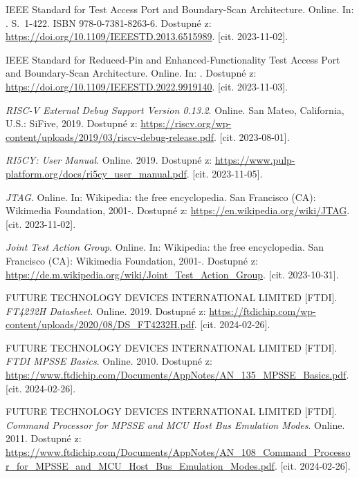 

\begin{thebibliography}{99}

IEEE Standard for Test Access Port and Boundary-Scan Architecture. Online. In: . S.~1-422. ISBN 978-0-7381-8263-6. Dostupné z: \url{https://doi.org/10.1109/IEEESTD.2013.6515989}. [cit. 2023-11-02].

IEEE Standard for Reduced-Pin and Enhanced-Functionality Test Access Port and Boundary-Scan Architecture. Online. In: . Dostupné z: \url{https://doi.org/10.1109/IEEESTD.2022.9919140}. [cit. 2023-11-03].

\textit{RISC-V External Debug Support Version 0.13.2}. Online. San Mateo, California, U.S.: SiFive, 2019. Dostupné z: \url{https://riscv.org/wp-content/uploads/2019/03/riscv-debug-release.pdf}. [cit. 2023-08-01].

\textit{RI5CY: User Manual}. Online. 2019. Dostupné z: \url{https://www.pulp-platform.org/docs/ri5cy\_user\_manual.pdf}. [cit. 2023-11-05].

\textit{JTAG}. Online. In: Wikipedia: the free encyclopedia. San Francisco (CA): Wikimedia Foundation, 2001-. Dostupné z: \url{https://en.wikipedia.org/wiki/JTAG}. [cit. 2023-11-02].

\textit{Joint Test Action Group}. Online. In: Wikipedia: the free encyclopedia. San Francisco (CA): Wikimedia Foundation, 2001-. Dostupné z: \url{https://de.m.wikipedia.org/wiki/Joint\_Test\_Action\_Group}. [cit. 2023-10-31].

FUTURE TECHNOLOGY DEVICES INTERNATIONAL LIMITED [FTDI]. \textit{FT4232H Datasheet}. Online. 2019. Dostupné z: \url{https://ftdichip.com/wp-content/uploads/2020/08/DS\_FT4232H.pdf}. [cit. 2024-02-26].

FUTURE TECHNOLOGY DEVICES INTERNATIONAL LIMITED [FTDI]. \textit{FTDI MPSSE Basics}. Online. 2010. Dostupné z: \url{https://www.ftdichip.com/Documents/AppNotes/AN\_135\_MPSSE\_Basics.pdf}. [cit. 2024-02-26].

FUTURE TECHNOLOGY DEVICES INTERNATIONAL LIMITED [FTDI]. \textit{Command Processor for MPSSE and MCU Host Bus Emulation Modes}. Online. 2011. Dostupné z: \url{https://www.ftdichip.com/Documents/AppNotes/AN\_108\_Command\_Processor\_for\_MPSSE\_and\_MCU\_Host\_Bus\_Emulation\_Modes.pdf}. [cit. 2024-02-26].


\end{thebibliography}
